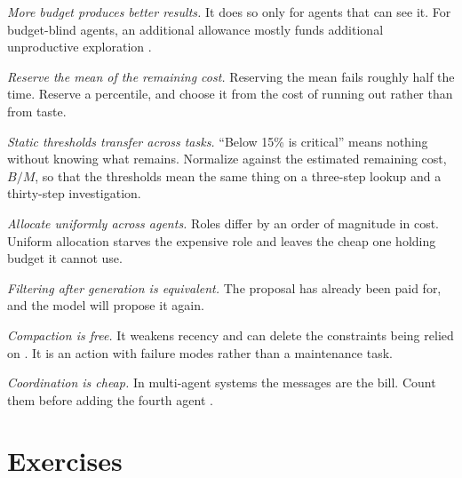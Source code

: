 \documentclass[11pt]{book}
\begin{document}
\textit{More budget produces better results.} It does so only for agents that can see it. For budget-blind agents, an additional allowance mostly funds additional unproductive exploration \cite{bats2025, budgettooluse2026}.

\textit{Reserve the mean of the remaining cost.} Reserving the mean fails roughly half the time. Reserve a percentile, and choose it from the cost of running out rather than from taste.

\textit{Static thresholds transfer across tasks.} ``Below 15\% is critical'' means nothing without knowing what remains. Normalize against the estimated remaining cost, $B/M$, so that the thresholds mean the same thing on a three-step lookup and a thirty-step investigation.

\textit{Allocate uniformly across agents.} Roles differ by an order of magnitude in cost. Uniform allocation starves the expensive role and leaves the cheap one holding budget it cannot use.

\textit{Filtering after generation is equivalent.} The proposal has already been paid for, and the model will propose it again.

\textit{Compaction is free.} It weakens recency \cite{compressreliab2026} and can delete the constraints being relied on \cite{govdecay2026}. It is an action with failure modes rather than a maintenance task.

\textit{Coordination is cheap.} In multi-agent systems the messages are the bill. Count them before adding the fourth agent \cite{cohesion2026}.

\section*{Exercises}
\end{document}
